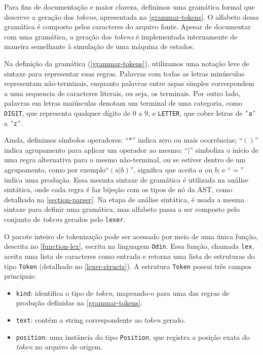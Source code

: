 Para fins de documentação e maior clareza, definimos uma gramática formal que descreve a geração dos \textit{tokens}, apresentada na \autoref{grammar-tokens}. O alfabeto dessa gramática é composto pelos caracteres do arquivo fonte. Apesar de documentar com uma gramática, a geração dos \textit{tokens} é implementada internamente de maneira semelhante à simulação de uma máquina de estados.

Na definição da gramática (\autoref{grammar-tokens}), utilizamos uma notação leve de sintaxe para representar suas regras. Palavras com todas as letras minúsculas representam não-terminais, enquanto palavras entre aspas simples correspondem a uma sequencia de caracteres literais, ou seja, os terminais. Por outro lado, palavras em letras maiúsculas denotam um terminal de uma categoria, como \texttt{DIGIT}, que representa qualquer dígito de 0 a 9, e \texttt{LETTER}, que cobre letras de \texttt{'a'} a \texttt{'z'}.

Ainda, definimos símbolos operadores: ``$*$'' indica zero ou mais ocorrências; ``$()$'' indica agrupamento para aplicar um operador ao mesmo; ``$|$'' simboliza o início de uma regra alternativa para o mesmo não-terminal, ou se estiver dentro de um agrupamento, como por exemplo``$(a|b)$'', significa que aceita $a$ ou $b$; e ``$=$'' indica uma produção. Essa mesmta sintaxe de gramática é utilizada na análise sintática, onde cada regra é faz bijeção com os tipos de nó da AST, como detalhado na \autoref{section-parser}. Na etapa de análise sintática, é usada a mesma sintaxe para definir uma gramática, mas alfabeto passa a ser composto pelo conjunto de \textit{tokens} gerados pelo \texttt{lexer}.


O pacote inteiro de tokenização pode ser acessado por meio de uma única função, descrita no \autoref{function-lex}, escrita na linguagem \texttt{Odin}. Essa função, chamada \texttt{lex}, aceita uma lista de caracteres como entrada e retorna uma lista de estruturas do tipo \texttt{Token} (detalhado no \autoref{lexer-structs}). A estrutura \texttt{Token} possui três campos principais:

\begin{itemize}
    \item \texttt{kind}: identifica o tipo de \textit{token}, mapeando-o para uma das regras de produção definidas na \autoref{grammar-tokens}.
    \item \texttt{text}: contém a string correspondente ao \textit{token} gerado.
    \item \texttt{position}: uma instância do tipo \texttt{Position}, que registra a posição exata do \textit{token} no arquivo de origem.
\end{itemize}


